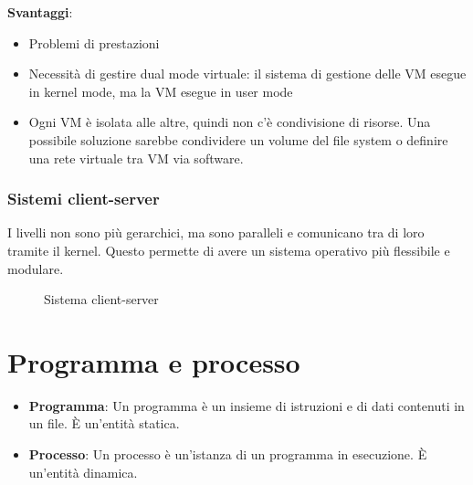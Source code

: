\documentclass[a4paper]{article}
\begin{document}
\noindent
\textbf{Svantaggi}:
\begin{itemize}
  \item Problemi di prestazioni
  \item Necessità di gestire dual mode virtuale: il sistema di gestione delle VM esegue
    in kernel mode, ma la VM esegue in user mode
  \item Ogni VM è isolata alle altre, quindi non c'è condivisione di risorse. Una 
    possibile soluzione sarebbe condividere un volume del file system o definire una rete
    virtuale tra VM via software.
\end{itemize}

\subsubsection{Sistemi client-server}
I livelli non sono più gerarchici, ma sono paralleli e comunicano tra di loro tramite
il kernel. Questo permette di avere un sistema operativo più flessibile e modulare.
\begin{figure}[H]
  \centering
  \caption{Sistema client-server}
\end{figure}

\section{Programma e processo}
\begin{itemize}
  \item \textbf{Programma}: Un programma è un insieme di istruzioni e di dati contenuti
    in un file. È un'entità statica.
  \item \textbf{Processo}: Un processo è un'istanza di un programma in esecuzione.
    È un'entità dinamica.
\end{itemize}
\end{document}
